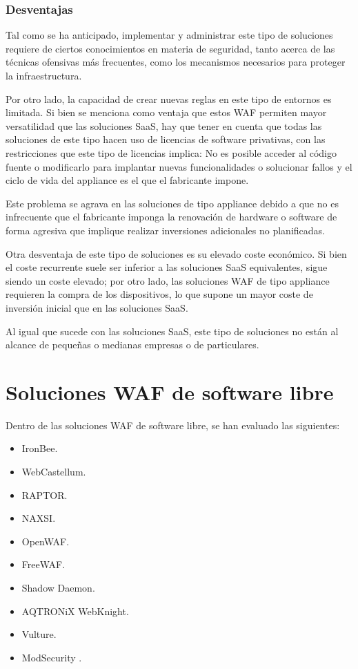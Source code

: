 \subsubsection{Desventajas}
\par Tal como se ha anticipado, implementar y administrar este tipo de soluciones requiere de ciertos conocimientos en materia de seguridad,
tanto acerca de las técnicas ofensivas más frecuentes, como los mecanismos necesarios para proteger la infraestructura.
\par Por otro lado, la capacidad de crear nuevas reglas en este tipo de entornos es limitada. Si bien se menciona como ventaja que estos WAF
permiten mayor versatilidad que las soluciones SaaS, hay que tener en cuenta que todas las soluciones de este tipo hacen uso de licencias de
software privativas, con las restricciones que este tipo de licencias implica:  No es posible acceder al código fuente o modificarlo para
implantar nuevas funcionalidades o solucionar fallos y el ciclo de vida del appliance es el que el fabricante impone.
\par Este problema se agrava en las soluciones de tipo appliance debido a que no es infrecuente que el fabricante imponga la renovación de
hardware o software de forma agresiva que implique realizar inversiones adicionales no planificadas.

\par Otra desventaja de este tipo de soluciones es su elevado coste económico. Si bien el coste recurrente suele ser inferior a las soluciones
SaaS equivalentes, sigue siendo un coste elevado; por otro lado, las soluciones WAF de tipo appliance requieren la compra de los dispositivos,
lo que supone un mayor coste de inversión inicial que en las soluciones SaaS.
\par Al igual que sucede con las soluciones SaaS, este tipo de soluciones no están al alcance de pequeñas o medianas empresas o de
particulares.

\section{Soluciones WAF de software libre}
\par Dentro de las soluciones WAF de software libre, se han evaluado las siguientes:
\begin{itemize}
  \item IronBee\cite{IronBee}.
  \item WebCastellum\cite{WebCastellum}.
  \item RAPTOR\cite{raptor}.
  \item NAXSI\cite{NAXSI}.
  \item OpenWAF\cite{openwaf}.
  \item FreeWAF\cite{freewaf}.
  \item Shadow Daemon\cite{ShadowDaemon}.
  \item AQTRONiX WebKnight\cite{WebKnight}.
  \item Vulture\cite{vulture}.
  \item ModSecurity \cite{modsecurity}.
\end{itemize}

